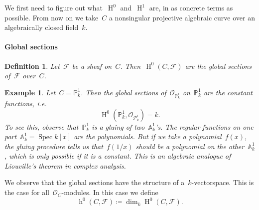 \documentclass[10pt,a4paper]{article}
\theoremstyle{lecture}
\newtheorem{definition}[theorem]{Definition}
\newtheorem{example}[theorem]{Example}
\newcommand\dash{\nobreakdash-\hspace{0pt}}
\DeclareMathOperator\hh{h}
\DeclareMathOperator\HH{H}
\DeclareMathOperator\Spec{Spec}
\begin{document}
We first need to figure out what~$\HH^0$ and~$\HH^1$ are, in as concrete terms as possible. From now on we take~$C$ a nonsingular projective algebraic curve over an algebraically closed field~$k$.
\paragraph{Global sections}
\begin{definition}
  Let~$\mathcal{F}$ be a sheaf on~$C$. Then~$\HH^0(C,\mathcal{F})$ are the \emph{global sections} of~$\mathcal{F}$ over~$C$.
\end{definition}
\begin{example}
  Let~$C=\mathbb{P}_k^1$. Then the global sections of~$\mathcal{O}_{\mathbb{P}_k^1}$ on~$\mathbb{P}_k^1$ are the constant functions, i.e.
  \begin{equation}
    \HH^0(\mathbb{P}_k^1,\mathcal{O}_{\mathcal{P}_k^1})=k.
  \end{equation}
  To see this, observe that~$\mathbb{P}_k^1$ is a gluing of two~$\mathbb{A}_k^1$'s. The regular functions on one part~$\mathbb{A}_k^1=\Spec k[x]$ are the polynomials. But if we take a polynomial~$f(x)$, the gluing procedure tells us that~$f(1/x)$ should be a polynomial on the other~$\mathbb{A}_k^1$, which is only possible if it is a constant. This is an algebraic analogue of \emph{Liouville's theorem} in complex analysis.
\end{example}
We observe that the global sections have the structure of a~$k$\dash vectorspace. This is the case for all~$\mathcal{O}_C$\dash modules. In this case we define
\begin{equation}
  \hh^0(C,\mathcal{F})\coloneqq\dim_k\HH^0(C,\mathcal{F}).
\end{equation}
\end{document}
